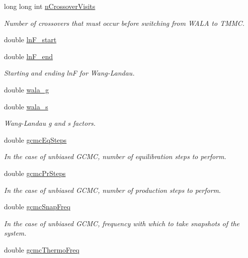 \begin{DoxyCompactItemize}
long long int \hyperlink{classsim_system_aa748f651ddd9a2bf6d88bfcab9153905}{n\-Crossover\-Visits}
\begin{DoxyCompactList}\small\item\em Number of crossovers that must occur before switching from W\-A\-L\-A to T\-M\-M\-C. \end{DoxyCompactList}\item 
double \hyperlink{classsim_system_a794334e163fbeb4b4f61bcea676679ce}{ln\-F\-\_\-start}
\item 
double \hyperlink{classsim_system_a3fb5d01fd3abf49f577c050968fba9d1}{ln\-F\-\_\-end}
\begin{DoxyCompactList}\small\item\em Starting and ending ln\-F for Wang-\/\-Landau. \end{DoxyCompactList}\item 
double \hyperlink{classsim_system_aa2e866e69ebe5fa0761894212592175a}{wala\-\_\-g}
\item 
double \hyperlink{classsim_system_a7cc3431bb59acca9165b044dbd07dcdc}{wala\-\_\-s}
\begin{DoxyCompactList}\small\item\em Wang-\/\-Landau g and s factors. \end{DoxyCompactList}\item 
double \hyperlink{classsim_system_aa83fc40dca4aa56d890dbc978da1ea4e}{gcmc\-Eq\-Steps}
\begin{DoxyCompactList}\small\item\em In the case of unbiased G\-C\-M\-C, number of equilibration steps to perform. \end{DoxyCompactList}\item 
double \hyperlink{classsim_system_ae477ed10d350665f6065774a12f884c8}{gcmc\-Pr\-Steps}
\begin{DoxyCompactList}\small\item\em In the case of unbiased G\-C\-M\-C, number of production steps to perform. \end{DoxyCompactList}\item 
double \hyperlink{classsim_system_ad899e42a50a3ae94ac18663bca5bd8b3}{gcmc\-Snap\-Freq}
\begin{DoxyCompactList}\small\item\em In the case of unbiased G\-C\-M\-C, frequency with which to take snapshots of the system. \end{DoxyCompactList}\item 
double \hyperlink{classsim_system_a91d057904fa4d57543fef4133294899f}{gcmc\-Thermo\-Freq}

\end{DoxyCompactItemize}
